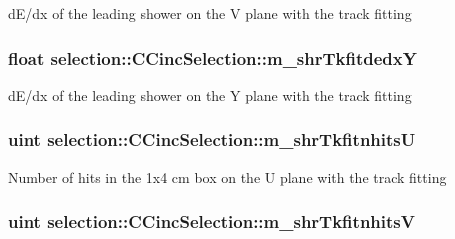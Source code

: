 d\-E/dx of the leading shower on the V plane with the track fitting \hypertarget{classselection_1_1CCincSelection_aa619cb73a3bb42251eaf5b35445e788b}{
\subsubsection[{m\-\_\-shr\-Tkfitdedx\-Y}]{\setlength{\rightskip}{0pt plus 5cm}float selection\-::\-C\-Cinc\-Selection\-::m\-\_\-shr\-Tkfitdedx\-Y\hspace{0.3cm}{\ttfamily [private]}}}\label{classselection_1_1CCincSelection_aa619cb73a3bb42251eaf5b35445e788b}
d\-E/dx of the leading shower on the Y plane with the track fitting \hypertarget{classselection_1_1CCincSelection_a3617f2e35ecc3cd9ceb53108b4c288cb}{
\subsubsection[{m\-\_\-shr\-Tkfitnhits\-U}]{\setlength{\rightskip}{0pt plus 5cm}uint selection\-::\-C\-Cinc\-Selection\-::m\-\_\-shr\-Tkfitnhits\-U\hspace{0.3cm}{\ttfamily [private]}}}\label{classselection_1_1CCincSelection_a3617f2e35ecc3cd9ceb53108b4c288cb}
Number of hits in the 1x4 cm box on the U plane with the track fitting \hypertarget{classselection_1_1CCincSelection_a8ad70697906b08285a218c739e8c4815}{
\subsubsection[{m\-\_\-shr\-Tkfitnhits\-V}]{\setlength{\rightskip}{0pt plus 5cm}uint selection\-::\-C\-Cinc\-Selection\-::m\-\_\-shr\-Tkfitnhits\-V\hspace{0.3cm}{\ttfamily [private]}}}\label{classselection_1_1CCincSelection_a8ad70697906b08285a218c739e8c4815}
